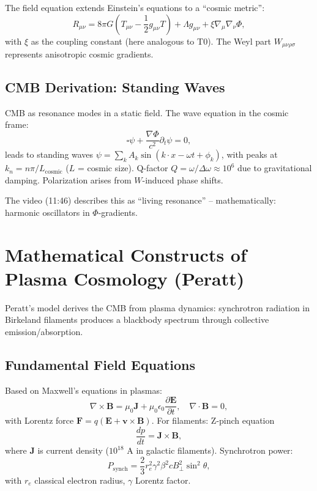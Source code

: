	The field equation extends Einstein's equations to a ``cosmic metric'':
	\begin{equation}
		R_{\mu\nu} = 8\pi G \left(T_{\mu\nu} - \frac{1}{2} g_{\mu\nu} T\right) + \Lambda g_{\mu\nu} + \xi \nabla_\mu \nabla_\nu \Phi,
	\end{equation}
	with $\xi$ as the coupling constant (here analogous to T0). The Weyl part $W_{\mu\nu\rho\sigma}$ represents anisotropic cosmic gradients.
	
	\subsection{CMB Derivation: Standing Waves}
	CMB as resonance modes in a static field. The wave equation in the cosmic frame:
	\begin{equation}
		\square \psi + \frac{\nabla \Phi}{c^2} \partial_t \psi = 0,
	\end{equation}
	leads to standing waves $\psi = \sum_k A_k \sin(k \cdot x - \omega t + \phi_k)$, with peaks at $k_n = n \pi / L_{\text{cosmic}}$ ($L$ = cosmic size). Q-factor $Q = \omega / \Delta \omega \approx 10^6$ due to gravitational damping. Polarization arises from $W$-induced phase shifts.
	
	The video (11:46) describes this as ``living resonance'' -- mathematically: harmonic oscillators in $\Phi$-gradients.
	
	\section{Mathematical Constructs of Plasma Cosmology (Peratt)}
	Peratt's model \cite{peratt1992} derives the CMB from plasma dynamics: synchrotron radiation in Birkeland filaments produces a blackbody spectrum through collective emission/absorption.
	
	\subsection{Fundamental Field Equations}
	Based on Maxwell's equations in plasmas:
	\begin{equation}
		\nabla \times \mathbf{B} = \mu_0 \mathbf{J} + \mu_0 \epsilon_0 \frac{\partial \mathbf{E}}{\partial t}, \quad \nabla \cdot \mathbf{B} = 0,
	\end{equation}
	with Lorentz force $\mathbf{F} = q(\mathbf{E} + \mathbf{v} \times \mathbf{B})$. For filaments: Z-pinch equation
	\begin{equation}
		\frac{dp}{dt} = \mathbf{J} \times \mathbf{B},
	\end{equation}
	where $\mathbf{J}$ is current density ($10^{18}$ A in galactic filaments). Synchrotron power:
	\begin{equation}
		P_{\text{synch}} = \frac{2}{3} r_e^2 \gamma^2 \beta^2 c B_\perp^2 \sin^2 \theta,
	\end{equation}
	with $r_e$ classical electron radius, $\gamma$ Lorentz factor.
	
